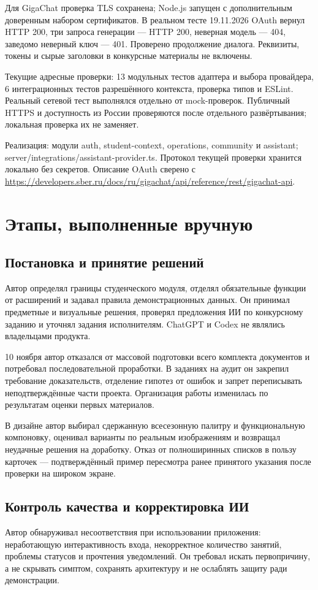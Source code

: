\documentclass[11pt,a4paper]{article}
\newcommand{\source}[1]{{\small\color{muted}#1\par}}
\begin{document}
Для GigaChat проверка TLS сохранена; Node.js запущен с дополнительным доверенным набором сертификатов. В реальном тесте 19.11.2026 OAuth вернул HTTP 200, три запроса генерации — HTTP 200, неверная модель — 404, заведомо неверный ключ — 401. Проверено продолжение диалога. Реквизиты, токены и сырые заголовки в конкурсные материалы не включены.

Текущие адресные проверки: 13 модульных тестов адаптера и выбора провайдера, 6 интеграционных тестов разрешённого контекста, проверка типов и ESLint. Реальный сетевой тест выполнялся отдельно от mock-проверок. Публичный HTTPS и доступность из России проверяются после отдельного развёртывания; локальная проверка их не заменяет.
\source{Реализация: модули auth, student-context, operations, community и assistant; server/integrations/assistant-provider.ts. Протокол текущей проверки хранится локально без секретов. Описание OAuth сверено с \url{https://developers.sber.ru/docs/ru/gigachat/api/reference/rest/gigachat-api}.}
\clearpage
\section{Этапы, выполненные вручную}
\subsection{Постановка и принятие решений}
Автор определял границы студенческого модуля, отделял обязательные функции от расширений и задавал правила демонстрационных данных. Он принимал предметные и визуальные решения, проверял предложения ИИ по конкурсному заданию и уточнял задания исполнителям. ChatGPT и Codex не являлись владельцами продукта.

10 ноября автор отказался от массовой подготовки всего комплекта документов и потребовал последовательной проработки. В заданиях на аудит он закрепил требование доказательств, отделение гипотез от ошибок и запрет переписывать неподтверждённые части проекта. Организация работы изменилась по результатам оценки первых материалов.

В дизайне автор выбирал сдержанную всесезонную палитру и функциональную компоновку, оценивал варианты по реальным изображениям и возвращал неудачные решения на доработку. Отказ от полноширинных списков в пользу карточек — подтверждённый пример пересмотра ранее принятого указания после проверки на широком экране.

\subsection{Контроль качества и корректировка ИИ}
Автор обнаруживал несоответствия при использовании приложения: неработающую интерактивность входа, некорректное количество занятий, проблемы статусов и прочтения уведомлений. Он требовал искать первопричину, а не скрывать симптом, сохранять архитектуру и не ослаблять защиту ради демонстрации.
\end{document}
